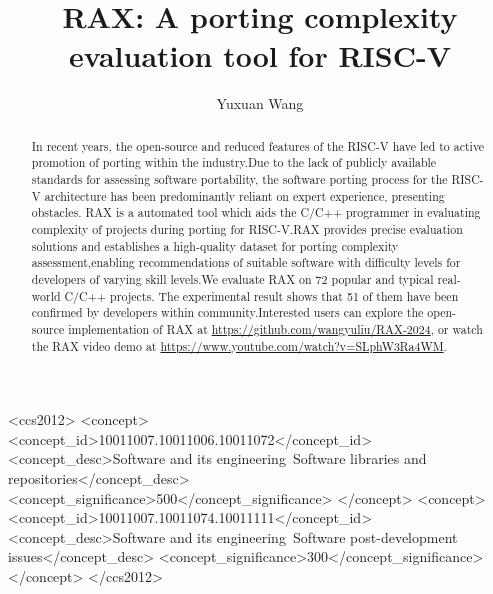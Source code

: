 \documentclass[sigconf,screen,review,anonymous]{acmart}
\begin{document}
\title{RAX: A porting complexity evaluation tool for RISC-V}

\author{Yuxuan Wang}

\renewcommand{\shortauthors}{Yuxuan et al.}

\begin{abstract}
  In recent years, the open-source and reduced features of the RISC-V have led to active promotion of porting within the industry.Due to the lack of publicly available standards for assessing software portability, the software porting process for the RISC-V architecture has been predominantly reliant on expert experience, presenting obstacles. RAX is a automated tool which aids the C/C++ programmer in evaluating  complexity of projects during porting for RISC-V.RAX provides precise evaluation solutions and establishes a high-quality dataset for porting complexity assessment,enabling recommendations of suitable software with difficulty levels for developers of varying skill levels.We evaluate RAX on 72 popular and typical real-world C/C++ projects. The experimental result shows that 51 of them have been confirmed by developers within community.Interested users can explore the open-source implementation of RAX at \href{https://github.com/wangyuliu/RAX-2024}{https://github.com/wangyuliu/RAX-2024}, or watch the RAX video demo at \href{https://www.youtube.com/watch?v=SLphW3Ra4WM}{https://www.youtube.com/watch?v=SLphW3Ra4WM}.
\end{abstract}

\begin{CCSXML}
<ccs2012>
    <concept>
        <concept_id>10011007.10011006.10011072</concept_id>
        <concept_desc>Software and its engineering~Software libraries and repositories</concept_desc>
        <concept_significance>500</concept_significance>
        </concept>
    <concept>
        <concept_id>10011007.10011074.10011111</concept_id>
        <concept_desc>Software and its engineering~Software post-development issues</concept_desc>
        <concept_significance>300</concept_significance>
    </concept>
</ccs2012>
\end{CCSXML}
  
\end{document}
